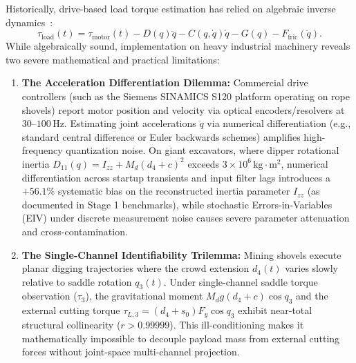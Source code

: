 \documentclass[journal]{IEEEtran}
\begin{document}
Historically, drive-based load torque estimation has relied on algebraic inverse dynamics~\cite{rasuli2014, spong2005}:
\begin{equation}
\tau_{\mathrm{load}}(t) = \tau_{\mathrm{motor}}(t) - D(q)\ddot{q} - C(q,\dot{q})\dot{q} - G(q) - F_{\mathrm{fric}}(\dot{q}).
\label{eq:inv_dyn}
\end{equation}
While algebraically sound, implementation on heavy industrial machinery reveals two severe mathematical and practical limitations:
\begin{enumerate}
    \item \textbf{The Acceleration Differentiation Dilemma:} Commercial drive controllers (such as the Siemens SINAMICS S120 platform operating on rope shovels) report motor position and velocity via optical encoders/resolvers at $30\text{--}100\,\mathrm{Hz}$. Estimating joint accelerations $\ddot{q}$ via numerical differentiation (e.g., standard central difference or Euler backwards schemes) amplifies high-frequency quantization noise. On giant excavators, where dipper rotational inertia $D_{11}(q) = I_{zz} + M_d (d_4+c)^2$ exceeds $3\times 10^6\,\mathrm{kg\cdot m^2}$, numerical differentiation across startup transients and input filter lags introduces a $+56.1\%$ systematic bias on the reconstructed inertia parameter $I_{zz}$ (as documented in Stage 1 benchmarks), while stochastic Errors-in-Variables (EIV) under discrete measurement noise causes severe parameter attenuation and cross-contamination.
    \item \textbf{The Single-Channel Identifiability Trilemma:} Mining shovels execute planar digging trajectories where the crowd extension $d_4(t)$ varies slowly relative to saddle rotation $q_3(t)$. Under single-channel saddle torque observation ($\tau_3$), the gravitational moment $M_d g (d_4+c)\cos q_3$ and the external cutting torque $\tau_{L,3} = (d_4+s_0) F_y \cos q_3$ exhibit near-total structural collinearity ($r > 0.99999$). This ill-conditioning makes it mathematically impossible to decouple payload mass from external cutting forces without joint-space multi-channel projection.
\end{enumerate}
\end{document}
